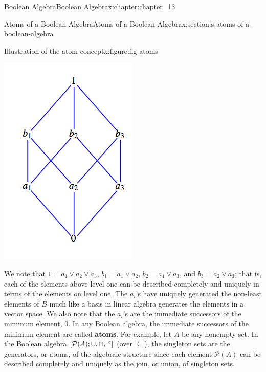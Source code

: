 \documentclass[twoside,10pt,]{book}
\newcommand{\terminology}[1]{\textbf{#1}}
\numberwithin{equation}{section}
\begin{document}
\begin{chapterptx}{Boolean Algebra}{}{Boolean Algebra}{}{}{x:chapter:chapter_13}
\begin{sectionptx}{Atoms of a Boolean Algebra}{}{Atoms of a Boolean Algebra}{}{}{x:section:s-atoms-of-a-boolean-algebra}
\begin{figureptx}{Illustration of the atom concept}{x:figure:fig-atoms}{}
\begin{image}{0.25}{0.5}{0.25}
\includegraphics[width=\linewidth]{images/fig-atoms.png}
\end{image}%
\tcblower
\end{figureptx}%
We note that \(1 = a_1 \lor  a_2 \lor  a_3\), \(b_1 = a_1 \lor  a_2\), \(b_2 = a_1 \lor  a_3\), and \(b_3 = a_2 \lor  a_3\); that is, each of the elements above level one can be described completely and uniquely in terms of the elements on level one. The \(a_i\)'s have uniquely generated the non-least elements of \(B\) much like a basis in linear algebra generates the elements in a vector space. We also note that the \(a_i\)'s are the immediate successors of the minimum element, 0. In any Boolean algebra, the immediate successors of the minimum element are called \terminology{atoms}.  For example, let \(A\) be any nonempty set. In the Boolean algebra \([\mathcal{P}(A); \cup , \cap, \hspace{1 mm}^c]\) (over \(\subseteq\)), the singleton sets are the generators, or atoms, of the algebraic structure since each element \(\mathcal{P}(A)\) can be described completely and uniquely as the join, or union, of singleton sets.%

\end{sectionptx}
\end{chapterptx}
\end{document}

